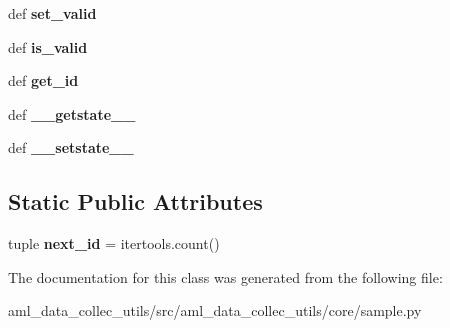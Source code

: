 \begin{DoxyCompactItemize}
\item 
\hypertarget{classaml__data__collec__utils_1_1core_1_1sample_1_1_sample_a971f7912e41892bb071bc2d88772b58f}{def {\bfseries set\-\_\-valid}}\label{classaml__data__collec__utils_1_1core_1_1sample_1_1_sample_a971f7912e41892bb071bc2d88772b58f}

\item 
\hypertarget{classaml__data__collec__utils_1_1core_1_1sample_1_1_sample_ac1e595cca20b29868301cbf3780c738c}{def {\bfseries is\-\_\-valid}}\label{classaml__data__collec__utils_1_1core_1_1sample_1_1_sample_ac1e595cca20b29868301cbf3780c738c}

\item 
\hypertarget{classaml__data__collec__utils_1_1core_1_1sample_1_1_sample_ad8043f88c777b842d6f9e348aa863b3e}{def {\bfseries get\-\_\-id}}\label{classaml__data__collec__utils_1_1core_1_1sample_1_1_sample_ad8043f88c777b842d6f9e348aa863b3e}

\item 
\hypertarget{classaml__data__collec__utils_1_1core_1_1sample_1_1_sample_afd4154c9fc8e1a77ddae467572631a54}{def {\bfseries \-\_\-\-\_\-getstate\-\_\-\-\_\-}}\label{classaml__data__collec__utils_1_1core_1_1sample_1_1_sample_afd4154c9fc8e1a77ddae467572631a54}

\item 
\hypertarget{classaml__data__collec__utils_1_1core_1_1sample_1_1_sample_ab85a80992e06e0b8cbad3327bac0cee4}{def {\bfseries \-\_\-\-\_\-setstate\-\_\-\-\_\-}}\label{classaml__data__collec__utils_1_1core_1_1sample_1_1_sample_ab85a80992e06e0b8cbad3327bac0cee4}

\end{DoxyCompactItemize}
\subsection*{Static Public Attributes}
\begin{DoxyCompactItemize}
\item 
\hypertarget{classaml__data__collec__utils_1_1core_1_1sample_1_1_sample_a28f76e0d757efe4e749da3adcbc6846c}{tuple {\bfseries next\-\_\-id} = itertools.\-count()}\label{classaml__data__collec__utils_1_1core_1_1sample_1_1_sample_a28f76e0d757efe4e749da3adcbc6846c}

\end{DoxyCompactItemize}


The documentation for this class was generated from the following file\-:\begin{DoxyCompactItemize}
\item 
aml\-\_\-data\-\_\-collec\-\_\-utils/src/aml\-\_\-data\-\_\-collec\-\_\-utils/core/sample.\-py\end{DoxyCompactItemize}
